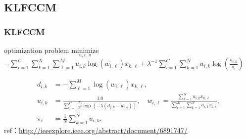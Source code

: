 \documentclass[fleqn,dvipdfmx,10pt]{beamer}
\begin{document}
\subsection{KLFCCM}
\begin{frame}\frametitle{KLFCCM}%
  \begin{block}{optimization problem}
    $\underset{u,v,\pi}{\text{minimize}}$
    $-\sum_{i=1}^C\sum_{k=1}^N\sum_{\ell=1}^Mu_{i,k}\log{(w_{i,\ell})}x_{k,\ell}+\lambda^{-1}\sum_{i=1}^C\sum_{k=1}^N u_{i,k}\log{(\frac{u_{i,k}}{\pi_i})}$\centering\\
  \end{block}
  \begin{align*}
    d_{i,k}&=-\sum_{\ell=1}^M\log(w_{i,\ell})x_{k,\ell},\\
    u_{i,k}&=\frac{1.0}{\sum_{j=1}^C\frac{\pi_{j}}{\pi_{i}}\exp\left(-\lambda(d_{j,k}-d_{i,k})\right)},\quad
    w_{i,\ell}=\frac{\sum_{k=1}^N u_{i,k}x_{k,\ell}}{\sum_{r=1}^M\sum_{k=1}^N u_{i,k}x_{k,r}},\\
    \pi_{i}&=\frac{1}{N}\sum_{k=1}^N u_{i,k}.
  \end{align*}
  ref：\url{http://ieeexplore.ieee.org/abstract/document/6891747/}\centering
\end{frame}
\end{document}
